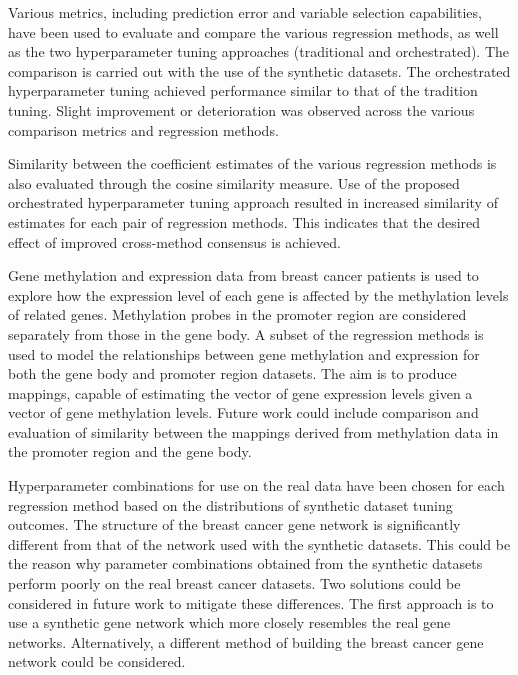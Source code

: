 Various metrics, including prediction error and variable selection capabilities, have been used to evaluate and compare the various regression methods, as well as the two hyperparameter tuning approaches (traditional and orchestrated). The comparison is carried out with the use of the synthetic datasets. The orchestrated hyperparameter tuning achieved performance similar to that of the tradition tuning. Slight improvement or deterioration was observed across the various comparison metrics and regression methods.

Similarity between the coefficient estimates of the various regression methods is also evaluated through the cosine similarity measure. Use of the proposed orchestrated hyperparameter tuning approach resulted in increased similarity of estimates for each pair of regression methods. This indicates that the desired effect of improved cross-method consensus is achieved.

Gene methylation and expression data from breast cancer patients is used to explore how the expression level of each gene is affected by the methylation levels of related genes. Methylation probes in the promoter region are considered separately from those in the gene body. A subset of the regression methods is used to model the relationships between gene methylation and expression for both the gene body and promoter region datasets. The aim is to produce mappings, capable of estimating the vector of gene expression levels given a vector of gene methylation levels. Future work could include comparison and evaluation of similarity between the mappings derived from methylation data in the promoter region and the gene body.

Hyperparameter combinations for use on the real data have been chosen for each regression method based on the distributions of synthetic dataset tuning outcomes. The structure of the breast cancer gene network is significantly different from that of the network used with the synthetic datasets. This could be the reason why parameter combinations obtained from the synthetic datasets perform poorly on the real breast cancer datasets. Two solutions could be considered in future work to mitigate these differences. The first approach is to use a synthetic gene network which more closely resembles the real gene networks. Alternatively, a different method of building the breast cancer gene network could be considered. 
